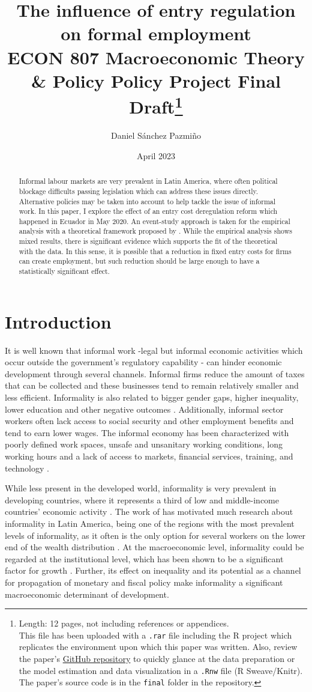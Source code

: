 \documentclass[11pt,a4paper]{article}\usepackage[]{graphicx}\usepackage[]{xcolor}
\title{The influence of entry regulation on formal employment \\[1em] 
\large{ECON 807 Macroeconomic Theory \& Policy Policy Project Final Draft}\footnote{
Length: 12 pages, not including references or appendices. \\
This file has been uploaded with a \texttt{.rar} file including the R project which replicates the environment upon which this paper was written. Also, review the paper's \href{https://github.com/dsanchezp18/econ807-policy-project}{GitHub repository} to quickly glance at the data preparation or the model estimation and data visualization in a \texttt{.Rnw} file (R Sweave/Knitr). The paper's source code is in the \texttt{final} folder in the repository.}}
\author{Daniel Sánchez Pazmiño}
\date{April 2023}
\begin{document}
\maketitle

\begin{abstract}

Informal labour markets are very prevalent in Latin America, where often political blockage difficults passing legislation which can address these issues directly. Alternative policies may be taken into account to help tackle the issue of informal work. In this paper, I explore the effect of an entry cost deregulation reform which happened in Ecuador in May 2020. An event-study approach is taken for the empirical analysis with a theoretical framework proposed by \textcite{Branstetter.2014}. While the empirical analysis shows mixed results, there is significant evidence which supports the fit of the theoretical with the data. In this sense, it is possible that a reduction in fixed entry costs for firms can create employment, but such reduction should be large enough to have a statistically significant effect.
\end{abstract}

\section{Introduction}

It is well known that informal work -legal but informal economic activities which occur outside the government's regulatory capability \parencite{Sassen.1994}- can hinder economic development through several channels. Informal firms reduce the amount of taxes that can be collected and these businesses tend to remain relatively smaller and less efficient. Informality is also related to bigger gender gaps, higher inequality, lower education and other negative outcomes \parencite{Delechat2020}. Additionally, informal sector workers often lack access to social security and other employment benefits and tend to earn lower wages. The informal economy has been characterized with poorly defined work spaces, unsafe and unsanitary working conditions, long working hours and a lack of access to markets, financial services, training, and technology \parencite{IloND}. 

While less present in the developed world, informality is very prevalent in developing countries, where it represents a third of low and middle-income countries' economic activity \parencite{Delechat2020}. The work of \textcite{Soto.2002} has motivated much research about informality in Latin America, being one of the regions with the most prevalent levels of informality, as it often is the only option for several workers on the lower end of the wealth distribution \parencite{Oviedo.2009}. At the macroeconomic level, informality could be regarded at the institutional level, which has been shown to be a significant factor for growth \parencite{Acemoglu.2001, RafaelLaPorta.1997, Glaeser.2004}. Further, its effect on inequality and its potential as a channel for propagation of monetary and fiscal policy \parencite{Alberola.2020} make informality a significant macroeconomic determinant of development.
\end{document}
